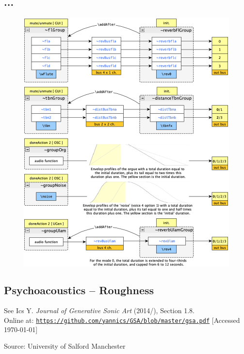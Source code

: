 \documentclass{article}
\begin{document}
\subsection*{...}

\begin{figure}[H]
\centering
\includegraphics[width=\textwidth-1mm]{../img/9940}
\label{struc}
\end{figure}

\newpage
\subsection*{Psychoacoustics -- Roughness}

See Ics Y. \textit{Journal of Generative Sonic Art} (2014/\the\year), Section 1.8.\\ Online at: \href{https://github.com/yannics/GSA/blob/master/gsa.pdf}{\texttt{\small https://github.com/yannics/GSA/blob/master/gsa.pdf}} [Accessed \today]

\bigskip

Source:  University of Salford Manchester 
\end{document}
